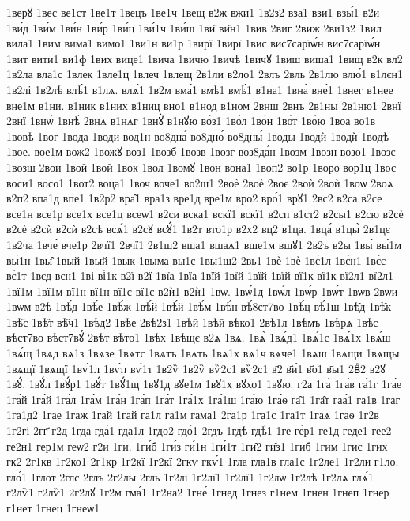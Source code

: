 {1верꙋ
1вес
ве1ст
1ве1т
1вецъ
1ве1ч
1вещ
в2ж
вжи1
1в2з2
вза1
взи1
взы́1
в2и
1ви́д
1ви́м
1ви́н
1ви́р
1ви́ц
1ви́1ч
1ви́ш
1ви̑
ви̑н1
1вив
2виг
2виж
2ви1з2
1вил
вила1
1вим
вима1
вимо1
1ви1н
ви1р
1вирї
1вирї
1вис
вис7сарїѡ́н
вис7сарїѡ́н
1вит
вити1
ви1ф
1вих
вице1
1вича
1вичю
1вичѣ
1вичꙋ
1виш
виша1
1вищ
в2к
вл2
1в2ла
вла1с
1влек
1вле1ц
1влеч
1влещ
2в1ли
в2ло1
2влъ
2вль
2в1лю
влю́1
в1лєн1
1в2лі
1в2лѣ
влѣ́1
в1лѧ.
влѧ́1
1в2м
вма́1
вмѣ1
вмѣ́1
в1на1
1вна̀
вне́1
1внег
в1нее
вне1м
в1ни.
в1ник
в1них
в1ниц
вно1
в1нод
в1ном
2внш
2внъ
2в1ны
2в1ню1
2внї
2внї
1внѡ́
1внѣ̀
2внѧ
в1нѧг
1внꙋ̀
в1нꙋю
во́з1
1во́л
1во́н
1во́т
1во́ю
1воа
во1в
1вовѣ
1вог
1вода
1води
вод1н
во8дна́
во8дно́
во8дны́
1воды
1водѝ
1водѝ
1водѣ
1вое.
вое1м
вож2
1вожꙋ
воз1
1возб
1возв
1возг
воз8да́н
1возм
1возн
возо1
1возс
1возш
2вои
1вой
1вой
1вок
1вол
1вомꙋ
1вон
вона1
1воп2
во1р
1воро
вор1ц
1вос
воси1
восо1
1вот2
воца1
1воч
воче1
во2ш1
2воѐ
2воѐ
2воє
2воѝ
2воѝ
1воѡ
2воѧ
в2п2
впа1д
впе1
1в2р2
вра̑1
вра1з
вре1д
вре1м
вро2
вро́1
врꙋ1
2вс2
в2са
в2се
все1н
все1р
все1х
все1ц
всеѡ1
в2си
вска1
вскї1
вскї1
в2сп
в1ст2
в2сы1
в2сю
в2сѐ
в2сѐ
в2сѝ
в2сѝ
в2сѣ
всѧ́1
в2сꙋ
всꙋ́1
1в2т
вто1р
в2х2
вц2
в1ца.
1вца́
в1цы̀
2в1цє
1в2ча
1вче́
вче1р
2вчї1
2вчї1
2в1ш2
вша1
вшаѧ1
вше1м
вшꙋ1
2в2ъ
в2ы
1вы́
вы́1м
вы́1н
1вы̑
1вый
1вый
1вык
1выма
вы1с
1вы1ш2
2вь1
1вѐ
1вѐ
1вє́1л
1вє́н1
1вє́с
вє́1т
1вєд
вєн1
1ві
ві́1к
в2ї
в2ї
1вїа
1вїа
1вїй
1вїй
1вїй
1вїй
вї1к
вї1к
вї2л1
вї2л1
1вї1м
1вї1м
вї1н
вї1н
вї1с
вї1с
в2ѝ1
в2ѝ1
1вѡ.
1вѡ́1д
1вѡ́л
1вѡ́р
1вѡ́т
1вѡв
2вѡи
1вѡм
в2ѣ
1вѣ́д
1вѣ́е
1вѣ́ж
1вѣ́й
1вѣ́й
1вѣ́м
1вѣ́н
вѣ́8ст7во
1вѣ́ц
вѣ́1ш
1вѣ̑д
1вѣ̑к
1вѣ̑с
1вѣ̑т
вѣ̑ч1
1вѣд2
1вѣе
2вѣ2з1
1вѣй
1вѣй
вѣко1
2вѣ1л
1вѣмъ
1вѣрѧ
1вѣс
вѣст7во
вѣст7вꙋ́
2вѣт
вѣто1
1вѣх
1вѣщє
в2ѧ
1вѧ.
1вѧ̀
1вѧ́д1
1вѧ́1с
1вѧ́1х
1вѧ́ш
1вѧ́щ
1вѧд
вѧ1з
1вѧзе
1вѧтс
1вѧтъ
1вѧть
1вѧ1х
вѧ1ч
вѧче1
1вѧш
1вѧщи
1вѧщы
1вѧщї
1вѧщї
1вѵ́1л
1вѵ́п
вѵ́1т
1в2ѷ
1в2ѷ
вѷ2с1
вѷ2с1
в҃2
в҃и́1
в҃о1
в҃ы1
2вⷣ2
в2ꙋ
1вꙋ́.
1вꙋ́л
1вꙋ́р1
1вꙋ́т
1вꙋ́1щ
1вꙋ1д
вꙋе1м
1вꙋ1х
вꙋхо1
1вꙋю.
г2а
1га̀
1га́в
га́1г
1га́е
1га́й
1га́й
1га́л
1га́м
1га́н
1га́п
1га́т
1га́1х
1га́1ш
1га́ю
1га́ѳ
га̑1
1га̑т
гаа́1
га1в
1гаг
1га1д2
1гае
1гаж
1гай
1гай
га1л
га1м
гама1
2га1р
1га1с
1га1т
1гаѧ
1гаѳ
1г2в
1г2гі
2гг҃
г2д
1гда
гда́1
гда1л
1гдо2
гдо́1
2гдъ
1гдѣ
гдѣ́1
1ге
ге́р1
ге1д
геде1
гее2
ге2н1
гер1м
геѡ2
г2и
1ги.
1ги́б
1ги́з
ги́1н
1ги́1т
1ги̑2
ги̑з1
1гиб
1гим
1гис
1гих
гк2
2г1кв
1г2ко1
2г1кр
1г2кї
1г2кї
2гкѵ
гкѵ́1
1гла
гла1в
гла1с
1г2ле1
1г2ли
г1ло.
гло́1
1глот
2глс
2глъ
2г2лы
2гль
1г2лі
1г2лї1
1г2лї1
1г2лѡ
1г2лѣ
1г2лѧ
глѧ́1
г2лѷ1
г2лѷ1
2г2лꙋ
1г2м
гма́1
1г2на2
1гне́
1гнед
1гнез
г1нем
1гнен
1гнеп
1гнер
г1нет
1гнец
1гнеѡ1
}
